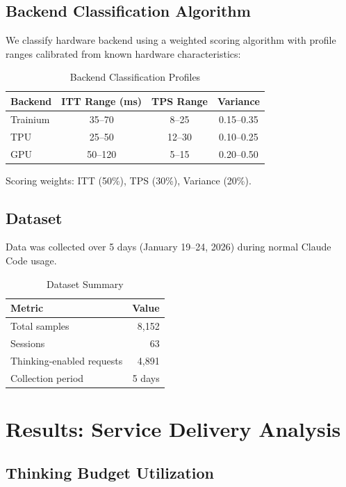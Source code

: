 \documentclass[11pt,a4paper]{article}
\begin{document}
\subsection{Backend Classification Algorithm}

We classify hardware backend using a weighted scoring algorithm with profile ranges calibrated from known hardware characteristics:

\begin{table}[H]
\centering
\caption{Backend Classification Profiles}
\begin{tabular}{lccc}
\toprule
Backend & ITT Range (ms) & TPS Range & Variance \\
\midrule
Trainium & 35--70 & 8--25 & 0.15--0.35 \\
TPU & 25--50 & 12--30 & 0.10--0.25 \\
GPU & 50--120 & 5--15 & 0.20--0.50 \\
\bottomrule
\end{tabular}
\end{table}

Scoring weights: ITT (50\%), TPS (30\%), Variance (20\%).

\subsection{Dataset}

Data was collected over 5 days (January 19--24, 2026) during normal Claude Code usage.

\begin{table}[H]
\centering
\caption{Dataset Summary}
\begin{tabular}{lr}
\toprule
Metric & Value \\
\midrule
Total samples & 8,152 \\
Sessions & 63 \\
Thinking-enabled requests & 4,891 \\
Collection period & 5 days \\
\bottomrule
\end{tabular}
\end{table}

\section{Results: Service Delivery Analysis}

\subsection{Thinking Budget Utilization}
\end{document}
